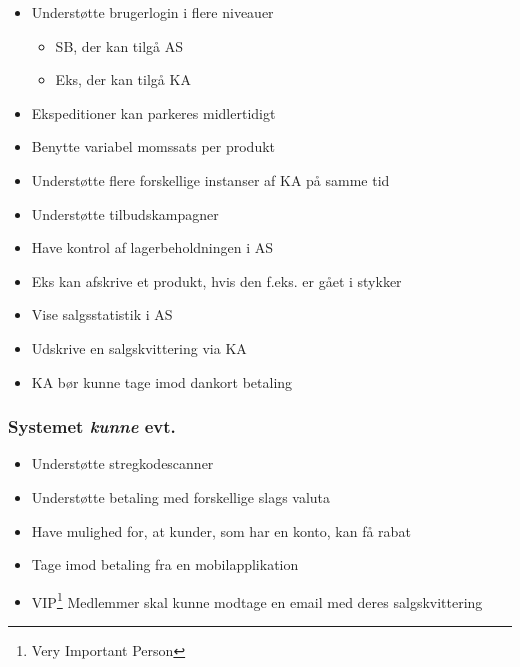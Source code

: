 \begin{itemize}
	
	\item Understøtte brugerlogin i flere niveauer
	\begin{itemize}
		\item  \gls{SB}, der kan tilgå \gls{AS}\\
		\item  \gls{Eks}, der kan tilgå \gls{KA}
	\end{itemize}
	\item Ekspeditioner kan parkeres midlertidigt
	\item Benytte variabel momssats per produkt
	\item Understøtte flere forskellige instanser af \gls{KA} på samme tid
	\item Understøtte tilbudskampagner
	\item Have kontrol af lagerbeholdningen i \gls{AS}
	\item \gls{Eks} kan afskrive et produkt, hvis den f.eks. er gået i stykker
	\item Vise salgsstatistik i \gls{AS}
	\item Udskrive en salgskvittering via \gls{KA}
	\item \gls{KA} bør kunne tage imod dankort betaling
	
\end{itemize}


\subsubsection*{Systemet \textit{kunne} evt.}

\begin{itemize}
	
	\item Understøtte stregkodescanner
	\item Understøtte betaling med forskellige slags valuta
	\item Have mulighed for, at kunder, som har en konto, kan få rabat
	\item Tage imod betaling fra en mobilapplikation
	\item VIP\footnote{Very Important Person} Medlemmer skal kunne modtage en email med deres salgskvittering
	
\end{itemize}